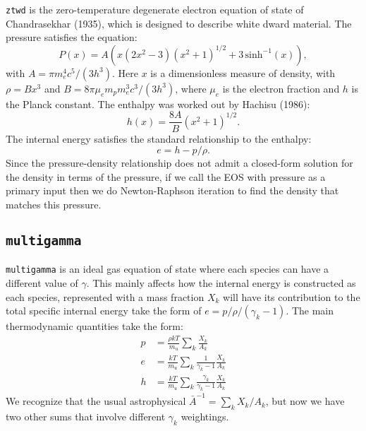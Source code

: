 {\tt ztwd} is the zero-temperature degenerate electron equation
  of state of Chandrasekhar (1935), which is designed to describe
  white dward material. The pressure satisfies the equation:
\begin{equation}
  P(x) = A \left( x(2x^2-3)(x^2 + 1)^{1/2} + 3\, \text{sinh}^{-1}(x) \right),
\end{equation}
with $A = \pi m_e^4 c^5 / (3 h^3)$. Here $x$ is a dimensionless
measure of density, with $\rho = B x^3$ and $B = 8\pi \mu_e m_p m_e^3
c^3 / (3h^3)$, where $\mu_e$ is the electron fraction and $h$ is the
Planck constant. The enthalpy was worked out by Hachisu (1986):
\begin{equation}
  h(x) = \frac{8A}{B}\left(x^2 + 1\right)^{1/2}.
\end{equation}
The internal energy satisfies the standard relationship to the enthalpy:
\begin{equation}
  e = h - p / \rho.
\end{equation}
Since the pressure-density relationship does not admit a closed-form
solution for the density in terms of the pressure, if we call the EOS
with pressure as a primary input then we do Newton-Raphson iteration
to find the density that matches this pressure.


\subsection{\tt multigamma}

{\tt multigamma} is an ideal gas equation of state where each
  species can have a different value of $\gamma$.  This mainly affects
  how the internal energy is constructed as each species, represented
  with a mass fraction $X_k$ will have its contribution to the total
  specific internal energy take the form of $e = p/\rho/(\gamma_k -
  1)$.  The main thermodynamic quantities take the form:
\begin{align}
p &= \frac{\rho k T}{m_u} \sum_k \frac{X_k}{A_k} \\
e &= \frac{k T}{m_u} \sum_k \frac{1}{\gamma_k - 1} \frac{X_k}{A_k} \\
h &= \frac{k T}{m_u} \sum_k \frac{\gamma_k}{\gamma_k - 1} \frac{X_k}{A_k}
\end{align}
We recognize that the usual astrophysical $\bar{A}^{-1} = \sum_k
X_k/A_k$, but now we have two other sums that involve different
$\gamma_k$ weightings.

